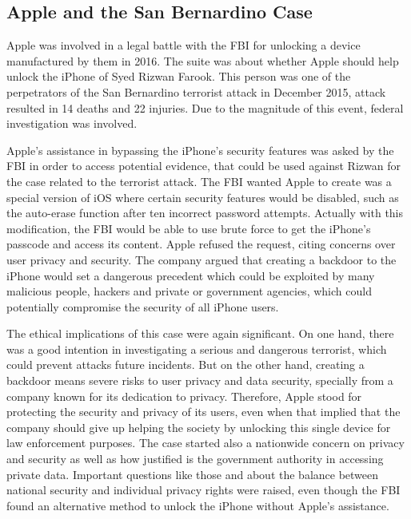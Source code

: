 \subsection{Apple and the San Bernardino Case}\label{subsec:apple-and-the-san-bernardino-case}
Apple was involved in a legal battle with the FBI for unlocking a device manufactured by them in 2016\Cite{Benner2016_AppleFightsOrder}.
The suite was about whether Apple should help unlock the iPhone of Syed Rizwan Farook.
This person was one of the perpetrators of the San Bernardino terrorist attack in December 2015, attack resulted in 14 deaths and 22 injuries.
Due to the magnitude of this event, federal investigation was involved.

Apple's assistance in bypassing the iPhone's security features was asked by the FBI in order to access potential evidence, that could be used against Rizwan for the case related to the terrorist attack.
The FBI wanted Apple to create was a special version of iOS where certain security features would be disabled, such as the auto-erase function after ten incorrect password attempts.
Actually with this modification, the FBI would be able to use brute force to get the iPhone's passcode and access its content.
Apple refused the request, citing concerns over user privacy and security.
The company argued that creating a backdoor to the iPhone would set a dangerous precedent which could be exploited by many malicious people, hackers and private or government agencies, which could potentially compromise the security of all iPhone users.


The ethical implications of this case were again significant.
On one hand, there was a good intention in investigating a serious and dangerous terrorist, which could prevent attacks future incidents.
But on the other hand, creating a backdoor means severe risks to user privacy and data security, specially from a company known for its dedication to privacy.
Therefore, Apple stood for protecting the security and privacy of its users, even when that implied that the company should give up helping the society by unlocking this single device for law enforcement purposes.
The case started also a nationwide concern on privacy and security as well as how justified is the government authority in accessing private data.
Important questions like those and about the balance between national security and individual privacy rights were raised, even though the FBI found an alternative method to unlock the iPhone without Apple's assistance.


